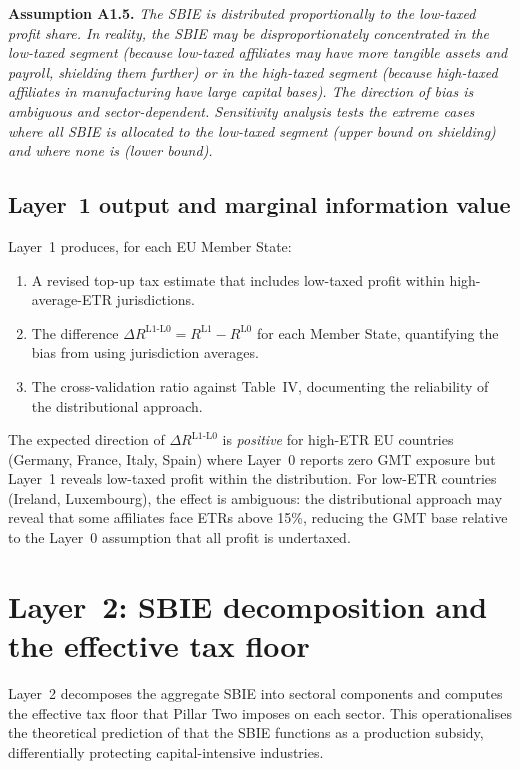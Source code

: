 \documentclass[11pt,a4paper]{article}
\newcommand{\assumption}[2]{\noindent\textbf{Assumption #1.} \textit{#2}\medskip}
\begin{document}
\assumption{A1.5}{The SBIE is distributed proportionally to the low-taxed profit share. In reality, the SBIE may be disproportionately concentrated in the low-taxed segment (because low-taxed affiliates may have more tangible assets and payroll, shielding them further) or in the high-taxed segment (because high-taxed affiliates in manufacturing have large capital bases). The direction of bias is ambiguous and sector-dependent. Sensitivity analysis tests the extreme cases where all SBIE is allocated to the low-taxed segment (upper bound on shielding) and where none is (lower bound).}

\subsection{Layer~1 output and marginal information value}

Layer~1 produces, for each EU Member State:
\begin{enumerate}
\item A revised top-up tax estimate that includes low-taxed profit within high-average-ETR jurisdictions.
\item The difference $\Delta R^{\text{L1-L0}} = R^{\text{L1}} - R^{\text{L0}}$ for each Member State, quantifying the bias from using jurisdiction averages.
\item The cross-validation ratio against Table~IV, documenting the reliability of the distributional approach.
\end{enumerate}

The expected direction of $\Delta R^{\text{L1-L0}}$ is \emph{positive} for high-ETR EU countries (Germany, France, Italy, Spain) where Layer~0 reports zero GMT exposure but Layer~1 reveals low-taxed profit within the distribution. For low-ETR countries (Ireland, Luxembourg), the effect is ambiguous: the distributional approach may reveal that some affiliates face ETRs above 15\%, reducing the GMT base relative to the Layer~0 assumption that all profit is undertaxed.

\section{Layer~2: SBIE decomposition and the effective tax floor}\label{sec:layer2}

Layer~2 decomposes the aggregate SBIE into sectoral components and computes the effective tax floor that Pillar Two imposes on each sector. This operationalises the theoretical prediction of \citet{schjelderup2024} that the SBIE functions as a production subsidy, differentially protecting capital-intensive industries.
\end{document}
